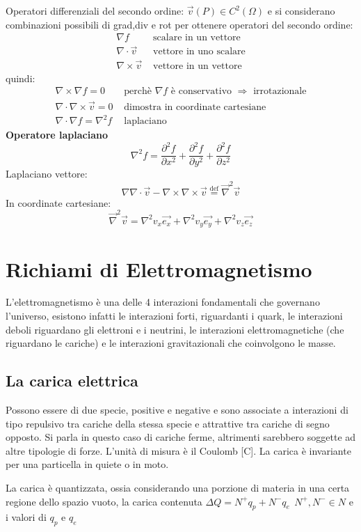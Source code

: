 Operatori differenziali del secondo ordine:
$ \vec{v}(P) \in C^2(\Omega) $ e si considerano combinazioni possibili di grad,div e rot per ottenere
operatori del secondo ordine:
\begin{align*}
\nabla f &\text{ scalare in un vettore}\\
\nabla\cdot\vec{v} &\text{ vettore in uno scalare}\\
\nabla\times\vec{v} &\text{ vettore in un vettore}
\end{align*}
quindi:
\begin{align*}
\nabla\times\nabla f = 0 &\text{ perchè $\nabla f$ è conservativo $\Rightarrow$ irrotazionale}\\
\nabla\cdot\nabla\times\vec{v} = 0 &\text{ dimostra in coordinate cartesiane}\\
\nabla\cdot \nabla f = \nabla^2 f &\text{ laplaciano}
\end{align*}
\textbf{Operatore laplaciano}
$$
\nabla^2 f = \frac{\partial^2f}{\partial x^2} + \frac{\partial^2f}{\partial y^2} + \frac{\partial^2f}{\partial z^2}
$$
Laplaciano vettore:
$$
\nabla\nabla\cdot\vec{v} - \nabla\times\nabla\times\vec{v} \stackrel{\text{def}}{=} \vec{\nabla}^2\vec{v}
$$
In coordinate cartesiane:
$$
\vec{\nabla}^2\vec{v} = \nabla^2v_x\vec{e_x} + \nabla^2v_y\vec{e_y} + \nabla^2v_z\vec{e_z}
$$

\newpage
\section{Richiami di Elettromagnetismo}
L'elettromagnetismo è una delle 4 interazioni fondamentali che governano l'universo, esistono infatti le interazioni forti, riguardanti i quark, le interazioni deboli riguardano gli elettroni e i 
neutrini, le interazioni elettromagnetiche (che riguardano le cariche) e le interazioni gravitazionali
che coinvolgono le masse.

\subsection{La carica elettrica}
Possono essere di due specie, positive e negative e sono associate a interazioni di tipo repulsivo tra
cariche della stessa specie e attrattive tra cariche di segno opposto.
Si parla in questo caso di cariche ferme, altrimenti sarebbero soggette ad altre tipologie di forze.
L'unità di misura è il Coulomb [\si{\coulomb}].
La carica è invariante per una particella in quiete o in moto.

La carica è quantizzata, ossia considerando una porzione di materia in una certa regione 
dello spazio vuoto, la carica contenuta $\Delta Q = N^+q_p + N^-q_e\ \ N^+,N^- \in N$
e i valori di $q_p$ e $q_e$ 

